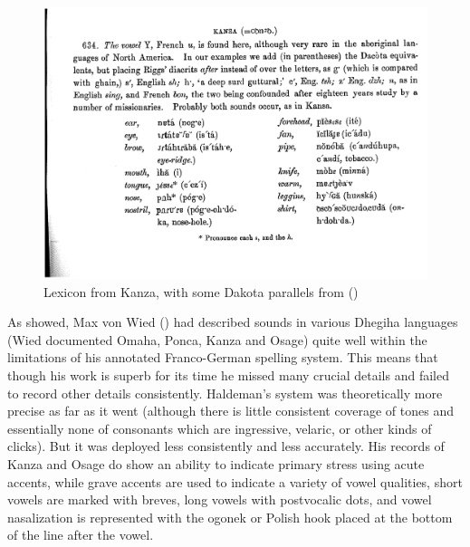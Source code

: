 \documentclass[output=paper]{LSP/langsci}
\begin{document}
\begin{figure}
\centering
\caption{Lexicon from Kanza, with some Dakota parallels from \citet{Riggs1852}  (\citealt[3, \S634]{Haldeman1860})} \label{haldemanlexicon}
\includegraphics[width=5in]{figures/GrantKanzaWords}
\end{figure}

As \citet{Rankin1994} showed, Max von Wied (\citeyear{Maximilian18391841}) had described sounds in various Dhegiha languages (Wied documented Omaha, Ponca, Kanza and Osage) quite well within the limitations of his annotated Franco-German spelling system. This means that though his work is superb for its time he missed many crucial details and failed to record other details consistently.   Haldeman's system was theoretically more precise as far as it went (although there is little consistent coverage of tones and essentially none of consonants which are ingressive, velaric, or other kinds of clicks). But it was deployed less consistently and less accurately.   His records of Kanza and Osage do show an ability to indicate primary stress using acute accents, while grave accents are used to indicate a variety of vowel qualities, short vowels are marked with breves, long vowels with postvocalic dots, and vowel nasalization is represented with the ogonek or Polish hook placed at the bottom of the line after the vowel.  
\end{document}
